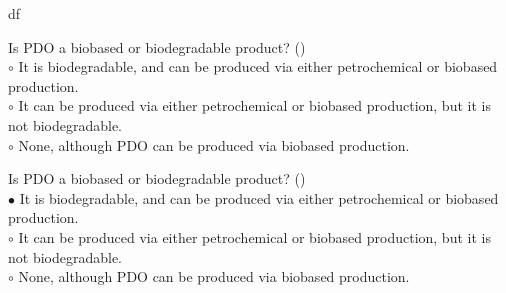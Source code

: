 df\documentclass[]{beamer}
\begin{document}
\begin{CJK}{UTF8}{gbsn}
\begin{frame}[shrink] {}
\addtocounter{questions}{1}
\color{blue}
Is PDO a biobased or biodegradable product?
({})\\
\color{black}
\setlength{\parindent}{-0.4cm}
{\color{red}$\circ$}  It is biodegradable, and can be produced via either petrochemical or biobased production.  \\
{\color{red}$\circ$} It can be produced via either petrochemical or biobased production, but it is not biodegradable.   \\
{\color{red}$\circ$} None, although PDO can be produced via biobased production.  \\
\end{frame}
\begin{frame}[shrink] {}
\addtocounter{answers}{1}
\color{blue}
Is PDO a biobased or biodegradable product?
({})\\
\color{black}
\setlength{\parindent}{-0.4cm}
{\color{red}$\bullet$} It is biodegradable, and can be produced via either petrochemical or biobased production.  \\
{\color{red}$\circ$} It can be produced via either petrochemical or biobased production, but it is not biodegradable.   \\
{\color{red}$\circ$} None, although PDO can be produced via biobased production.  \\
\end{frame}



\end{CJK}
\end{document}
